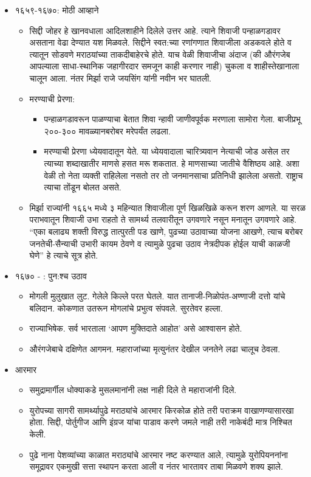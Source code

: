 \begin{itemize}[noitemsep,nolistsep]
\item १६५९-१६७०: मोठी आव्हाने
	\begin{itemize}[noitemsep,nolistsep]
	\item सिद्दी जोहर हे खानवधाला आदिलशाहीने दिलेले उत्तर आहे. त्याने शिवाजी पन्हाळगडावर असताना वेढा देण्यात यश मिळवले. सिद्दीने स्वत:च्या रणांगणात शिवाजीला अडकवले होते व त्यातून सोडवणे मराठयांच्या ताकदीबाहेरचे होते. याच वेळी शिवाजीचा अंदाज (की औरंगजेब आपल्याला साधा-स्थानिक जहागीरदार समजून काही करणार नाही) चुकला व शाहीस्तेखानाला चालून आला. नंतर मिर्झा राजे जयसिंग यांनी नवीन भर घातली.
	\item मरण्याची प्रेरणा:
		\begin{itemize}[noitemsep,nolistsep]
		\item पन्हाळगडावरून पाळण्याचा बेतात शिवा न्हावी जाणीवपूर्वक मरणाला सामोरा गेला. बाजीप्रभू २००-३०० मावळ्यानबरोबर मरेपर्यंत लढला.
		\item मरण्याची प्रेरणा ध्येयवादातून येते. या ध्येयवादाला चारित्र्यवान नेत्याची जोड असेल तर त्याच्या शब्दाखातीर माणसे हसत मरू शकतात. हे माणसाच्या जातीचे वैशिष्ठय आहे. अशा वेळी तो नेता व्यक्ती राहिलेला नसतो तर तो जनमानसाचा प्रतिनिधी झालेला असतो. राष्ट्राच त्याचा तोंडून बोलत असते.
		\end{itemize}

	\item मिर्झा राज्यांनी १६६५ मध्ये ३ महिन्यात शिवाजीला पूर्ण खिळखिळे करून शरण आणले. या सरळ पराभवातून शिवाजी उभा राहतो ते सामर्थ्य तलवारीतून उगवणारे नसून मनातून उगवणारे आहे. “एका बलाढ्य शक्ती विरुद्ध तात्पुरती पड खाणे, पुढच्या उठावाच्या योजना आखणे, त्याच बरोबर जनतेची-सैन्याची उभारी कायम ठेवणे व त्यामुळे पुढचा उठाव नेत्रदीपक होईल याची काळजी घेणे”  हे त्याचे सूत्र होते.
	\end{itemize}

\item १६७० - : पुन:श्च उठाव
	\begin{itemize}[noitemsep,nolistsep]
	\item मोगली मुलुखात लुट. गेलेले किल्ले परत घेतले. यात तानाजी-निळोपंत-अण्णाजी दत्तो यांचे बलिदान. कोकणात उतरून मोगलांचे प्रभुत्व संपवले. सुरतेवर हल्ला.
	\item राज्याभिषेक. सर्व भारताला ‘आपण मुक्तिदाते आहोत’ असे आश्वासन होते.
	\item औरंगजेबाचे दक्षिणेत आगमन. महाराजांच्या मृत्युनंतर देखील जनतेने लढा चालूच ठेवला.
	\end{itemize}

\item आरमार
	\begin{itemize}[noitemsep,nolistsep]
	\item समुद्रामार्गील धोक्याकडे मुसलमानांनी लक्ष नाही दिले ते महाराजांनी दिले.
	\item युरोपच्या सागरी सामर्थ्यापुढे मराठ्यांचे आरमार किरकोळ होते तरी पराक्रम वाखाणण्यासारखा होता. सिद्दी, पोर्तुगीज आणि इंग्रज यांचा पाडाव करणे जमले नाही तरी नाकेबंदी मात्र निश्चित केली.
	\item पुढे नाना पेशव्यांच्या काळात मराठ्यांचे आरमार नष्ट करण्यात आले, त्यामुळे युरोपियननांना समूद्रावर एकमुखी सत्ता स्थापन करता आली व नंतर भारतावर ताबा मिळवणे शक्य झाले.
	\end{itemize}


\end{itemize}
